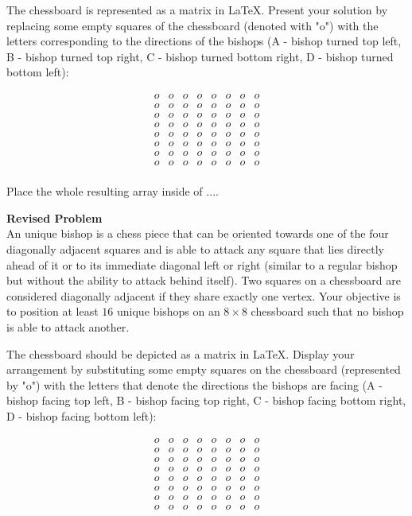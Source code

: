 The chessboard is represented as a matrix in LaTeX. 
Present your solution by replacing some empty squares of the chessboard (denoted with "o") with the letters corresponding to the directions of the bishops (A - bishop turned top left, B - bishop turned top right, C - bishop turned bottom right, D - bishop turned bottom left):

$$\begin{array}{cccccccc}
o & o & o & o & o & o & o & o \\
o & o & o & o & o & o & o & o \\
o & o & o & o & o & o & o & o \\
o & o & o & o & o & o & o & o \\
o & o & o & o & o & o & o & o \\
o & o & o & o & o & o & o & o \\
o & o & o & o & o & o & o & o \\
o & o & o & o & o & o & o & o \\
\end{array}$$

Place the whole resulting array inside of $\boxed{...}$.


\textbf{Revised Problem}\\
An unique bishop is a chess piece that can be oriented towards one of the four diagonally adjacent squares and is able to attack any square that lies directly ahead of it or to its immediate diagonal left or right (similar to a regular bishop but without the ability to attack behind itself). Two squares on a chessboard are considered diagonally adjacent if they share exactly one vertex. Your objective is to position at least $16$ unique bishops on an $8 \times 8$ chessboard such that no bishop is able to attack another.

The chessboard should be depicted as a matrix in LaTeX.
Display your arrangement by substituting some empty squares on the chessboard (represented by "o") with the letters that denote the directions the bishops are facing (A - bishop facing top left, B - bishop facing top right, C - bishop facing bottom right, D - bishop facing bottom left):

$$\begin{array}{cccccccc}
o & o & o & o & o & o & o & o \\
o & o & o & o & o & o & o & o \\
o & o & o & o & o & o & o & o \\
o & o & o & o & o & o & o & o \\
o & o & o & o & o & o & o & o \\
o & o & o & o & o & o & o & o \\
o & o & o & o & o & o & o & o \\
o & o & o & o & o & o & o & o \\
\end{array}$$

